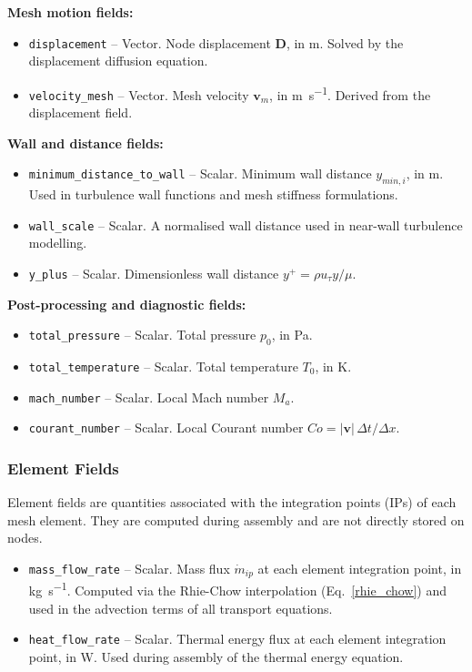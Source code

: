 \documentclass[12pt]{extarticle}
\newcommand{\<}{\langle}
\renewcommand{\>}{\rangle}
\theoremstyle{definition}
\begin{document}
\medskip
\noindent\textbf{Mesh motion fields:}
\begin{itemize}
    \item \texttt{displacement} -- Vector. Node displacement $\textbf{D}$, in \si{\metre}. Solved by the displacement diffusion equation.
    \item \texttt{velocity\_mesh} -- Vector. Mesh velocity $\textbf{v}_m$, in \si{\metre\per\second}. Derived from the displacement field.
\end{itemize}

\medskip
\noindent\textbf{Wall and distance fields:}
\begin{itemize}
    \item \texttt{minimum\_distance\_to\_wall} -- Scalar. Minimum wall distance $y_{min,i}$, in \si{\metre}. Used in turbulence wall functions and mesh stiffness formulations.
    \item \texttt{wall\_scale} -- Scalar. A normalised wall distance used in near-wall turbulence modelling.
    \item \texttt{y\_plus} -- Scalar. Dimensionless wall distance $y^+ = \rho u_\tau y / \mu$.
\end{itemize}

\medskip
\noindent\textbf{Post-processing and diagnostic fields:}
\begin{itemize}
    \item \texttt{total\_pressure} -- Scalar. Total pressure $p_0$, in \si{\pascal}.
    \item \texttt{total\_temperature} -- Scalar. Total temperature $T_0$, in \si{\kelvin}.
    \item \texttt{mach\_number} -- Scalar. Local Mach number $M_a$.
    \item \texttt{courant\_number} -- Scalar. Local Courant number $Co = |\textbf{v}|\,\Delta t / \Delta x$.
\end{itemize}

\subsubsection{Element Fields}

Element fields are quantities associated with the integration points (IPs) of each mesh element. They are computed during assembly and are not directly stored on nodes.

\begin{itemize}
    \item \texttt{mass\_flow\_rate} -- Scalar. Mass flux $\dot{m}_{ip}$ at each element integration point, in \si{\kilogram\per\second}. Computed via the Rhie-Chow interpolation (Eq.~\ref{rhie_chow}) and used in the advection terms of all transport equations.
    \item \texttt{heat\_flow\_rate} -- Scalar. Thermal energy flux at each element integration point, in \si{\watt}. Used during assembly of the thermal energy equation.
\end{itemize}
\end{document}
